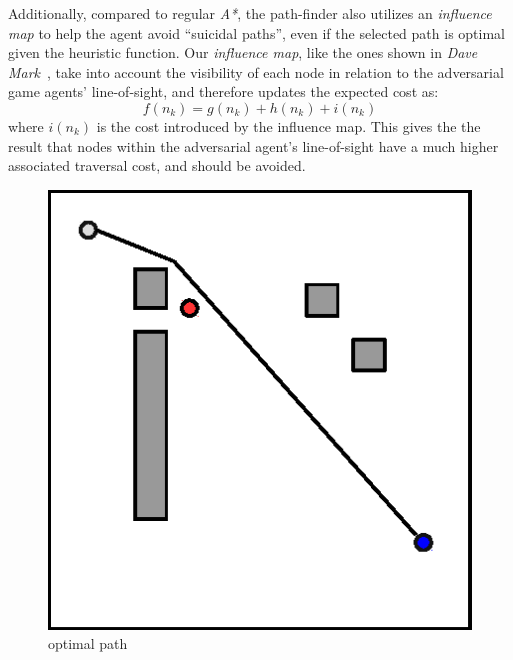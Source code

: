 \documentclass[a4paper, twocolumn]{article}
\begin{document}
    Additionally, compared to regular \emph{A*}, the path-finder also utilizes an \emph{influence map} to help the agent avoid ``suicidal paths'', even if the selected path is optimal given the heuristic function. Our \emph{influence map}, like the ones shown in \emph{Dave Mark}~\cite{mark2015modular}, take into account the visibility of each node in relation to the adversarial game agents' line-of-sight, and therefore updates the expected cost as:
	\begin{equation*}
		f(n_k) = g(n_k) + h(n_k) + i(n_k)
	\end{equation*} 
    where \(i(n_k)\) is the cost introduced by the influence map. This gives the the result that nodes within the adversarial agent's line-of-sight have a much higher associated traversal cost, and should be avoided. 
    \begin{minipage}{\linewidth}        	
    \centering
	\begin{minipage}{0.45\linewidth}
	\begin{figure}[H]
        \centering
		\includegraphics[width=\linewidth]{share/bad.eps}
		\caption{optimal path}
		\label{fig:optimal_path}
        \end{figure}
	\end{minipage}
	\hspace{0.00\linewidth}

\end{minipage}
\end{document}

